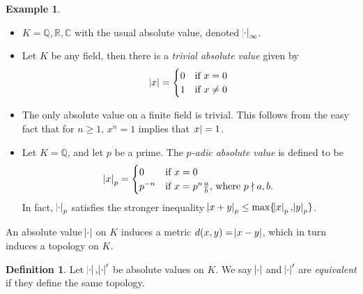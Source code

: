 \documentclass[12pt]{amsart}
\theoremstyle{definition}
\newtheorem{definition}{Definition}[section]
\newtheorem*{example}{Example}
\theoremstyle{plain}
\theoremstyle{remark}
\newcommand{\bQ}{\mathbb{Q}}
\newcommand{\bR}{\mathbb{R}}
\newcommand{\bC}{\mathbb{C}}
\begin{document}
\begin{example}\phantom{}
    \begin{itemize}
        \item $K = \bQ, \bR, \bC$ with the usual absolute value, denoted $\abs{\cdot}_\infty$.
        \item Let $K$ be any field, then there is a \emph{trivial absolute value} given by
            \begin{equation*}
                \abs{x} =
                \begin{cases}
                    0 & \text{if } x = 0 \\
                    1 & \text{if } x \neq 0
                \end{cases}
            \end{equation*}
        \item The only absolute value on a finite field is trivial. This follows from the easy fact that for $n \ge 1$, $x^n = 1$ implies that $\abs{x} = 1$.
        \item Let $K = \bQ$, and let $p$ be a prime. The \emph{$p$-adic absolute value} is defined to be
            \begin{equation*}
                \abs{x}_p =
                \begin{cases}
                    0 & \text{if } x = 0 \\
                    p^{-n} & \text{if } x = p^n \frac{a}{b}\text{, where } p \nmid a, b.
                \end{cases}
            \end{equation*}
            In fact, $\abs{\cdot}_p$ satisfies the stronger inequality $\abs{x + y}_p \le \max\{\abs{x}_p, \abs{y}_p\}$.
    \end{itemize}
\end{example}

\noindent An absolute value $\abs{\cdot}$ on $K$ induces a metric $d(x, y) = \abs{x - y}$, which in turn induces a topology on $K$.

\begin{definition}
    Let $\abs{\cdot}, \abs{\cdot}'$ be absolute values on $K$. We say $\abs{\cdot}$ and $\abs{\cdot}'$ are \emph{equivalent} if they define the same topology.
\end{definition}
\end{document}
